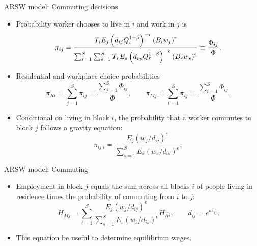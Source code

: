 \documentclass[10pt,notes=hide]{beamer}
\begin{document}
\begin{frame}{ARSW model: Commuting decisions}
\begin{itemize}
\item Probability worker chooses to live in $i$ and work in $j$ is
\begin{equation*} \label{eq:com_prob}
\pi _{ij}= \frac{T_{i} E_{j} \left( d_{ij}
Q_{i}^{1-\beta} \right)^{-\epsilon} \left( B_{i} w_{j} \right)^{\epsilon}}{%
\sum_{r=1}^{S} \sum_{s=1}^{S} T_{r} E_{s} \left( d_{rs} Q_{r}^{1-\beta}
\right)^{-\epsilon} \left( B_{r} w_{s} \right)^{\epsilon}} \equiv \frac{\Phi_{ij}}{\Phi} .
\end{equation*}
\item Residential and workplace choice probabilities
\begin{equation*} \label{eq:ch_prob}
\pi_{Ri} = \sum_{j=1}^{S} \pi_{ij} = \frac{\sum_{j=1}^{S} \Phi_{ij}}{\Phi}, \qquad  \pi_{Mj} = \sum_{i=1}^{S} \pi_{ij} = \frac{\sum_{i=1}^{S} \Phi_{ij}}{\Phi}.
\end{equation*}
\item Conditional on living in block $i$, the probability that a worker commutes to block $j$ follows a gravity equation:
\begin{equation*}
\pi _{ij|i}=\frac{ E_{j} \left( w_{j} / d_{ij} \right)^{\epsilon}}{
\sum_{s=1}^{S} E_{s} \left( w_{s} / d_{is} \right)^{\epsilon}},
\end{equation*}
\end{itemize}
\end{frame}
\begin{frame}{ARSW model: Commuting }
\begin{itemize}
\item Employment in block $j$ equals the sum across all blocks $i$ of people living in residence times the probability of commuting from $i$ to $j$:
\begin{equation*} \label{eq:wbo}
H_{Mj}=\sum_{i=1}^{S} \frac{E_{j}\left(
w_{j}/d_{ij}\right) ^{\epsilon }}{\sum_{s=1}^{S}E_{s}\left( w_{s}/d_{is}\right)
^{\epsilon }} H_{Ri}, \qquad d_{ij} = e^{\kappa \tau_{ij}}.
\end{equation*} \smallskip
\item This equation be useful to determine equilibrium wages. 
\end{itemize}
\end{frame}
\end{document}

